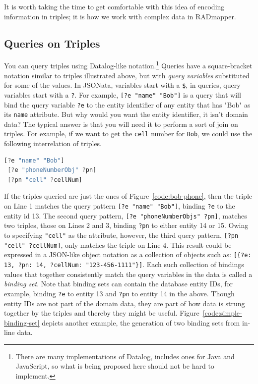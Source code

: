\documentclass[9pt,letterpaper]{article}
\newcommand{\stt}[1]{\texttt{#1}}
\begin{document}
It is worth taking the time to get comfortable with this idea of encoding information in triples;
it is how we work with complex data in RADmapper.


\subsection{Queries on Triples}
You can query triples using Datalog-like notation.\footnote{There are many implementations of Datalog, includes ones for Java and JavaScript, so what is being proposed here should not be hard to implement.} Queries have a square-bracket notation similar to triples illustrated above, but with \textit{query variables} substituted for some of the values.
In JSONata, variables start with a \stt{\$}, in queries, query variables start with a \stt{?}.
For example, \stt{[?e "name" "Bob"]} is a query that will bind the query variable \stt{?e} to the entity identifier of any entity that has "Bob" as its \stt{name} attribute.
But why would you want the entity identifier, it isn't domain data?
The typical answer is that you will need it to perform a sort of join on triples.
For example, if we want to get the \stt{cell} number for \stt{Bob}, we could use the following interrelation of triples.

\begin{lstlisting}[language=JavaScript,basicstyle=\ttfamily\scriptsize]
 [?e "name" "Bob"]
 [?e "phoneNumberObj" ?pn]
 [?pn "cell" ?cellNum]
\end{lstlisting}

If the triples queried are just the ones of Figure~\ref{code:bob-phone}, then the triple on Line 1 matches the query pattern \stt{[?e "name" "Bob"]}, binding \stt{?e} to the entity id 13.
The second query pattern, \stt{[?e "phoneNumberObjs" ?pn]}, matches two triples, those on Lines 2 and 3, binding \stt{?pn} to either entity 14 or 15.
Owing to specifying \stt{"cell"} as the attribute, however, the third query pattern, \stt{[?pn "cell" ?cellNum]}, only matches the triple on Line 4.
This result could be expressed in a JSON-like object notation as a collection of objects such as:
\stt{[\{?e: 13, ?pn: 14, ?cellNum: "123-456-1111"\}]}.
Each such collection of bindings values that together consistently match the query variables in the data is called a \textit{binding set}.
Note that binding sets can contain the database entity IDs, for example, binding \stt{?e} to entity 13 and \stt{?pn} to entity 14 in the above.
Though entity IDs are not part of the domain data, they are part of how data is strung together by the triples and thereby they might be useful.
Figure~\ref{code:simple-binding-set} depicts another example, the generation of two binding sets from in-line data.
\end{document}
